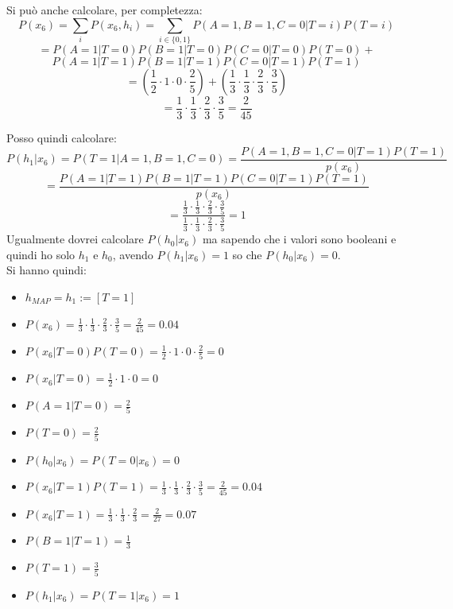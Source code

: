 \documentclass[a4paper,12pt, oneside]{book}
\begin{document}
\begin{esercizio}
  Si può anche calcolare, per completezza:
  \[P(x_6)=\sum_iP(x_6,h_i)=\sum_{i\in\{0,1\}}P(A=1,B=1,C=0|T=i)P(T=i)\]
  \[= P(A=1|T=0)P(B=1|T=0)P(C=0|T=0)P(T=0)+\]
  \[P(A=1|T=1)P(B=1|T=1)P(C=0|T=1)P(T=1)\]
  \[=( \frac{1}{2}\cdot 1\cdot  0\cdot\frac{2}{5})+(\frac{1}{3}\cdot
    \frac{1}{3}\cdot \frac{2}{3}\cdot\frac{3}{5})\]
  \[=\frac{1}{3}\cdot \frac{1}{3}\cdot
    \frac{2}{3}\cdot\frac{3}{5}=\frac{2}{45}\]

  Posso quindi calcolare:
  \[P(h_1|x_6)=P(T=1|A=1,B=1,C=0)=\frac{P(A=1,B=1,C=0|T=1)P(T=1)}{p(x_6)}\]
  \[=\frac{P(A=1|T=1)P(B=1|T=1)P(C=0|T=1)P(T=1)}{p(x_6)}\]
  \[=\frac{\frac{1}{3}\cdot \frac{1}{3}\cdot
      \frac{2}{3}\cdot\frac{3}{5}}
    {\frac{1}{3}\cdot \frac{1}{3}\cdot
      \frac{2}{3}\cdot\frac{3}{5}}=1\]
  Ugualmente dovrei calcolare $P(h_0|x_6)$ ma sapendo che i valori sono booleani
  e quindi ho solo $h_1$ e $h_0$, avendo $P(h_1|x_6)=1$ so che
  $P(h_0|x_6)=0$. \\
  Si hanno quindi:
  \begin{itemize}
    \item $h_{MAP}=h_1:=[T=1]$
    \item $P(x_6)=\frac{1}{3}\cdot \frac{1}{3}\cdot
    \frac{2}{3}\cdot\frac{3}{5}=\frac{2}{45}=0.04$
    \item $P(x_6|T=0)P(T=0)= \frac{1}{2}\cdot 1\cdot  0\cdot\frac{2}{5}=0$
    \item $P(x_6|T=0)= \frac{1}{2}\cdot 1\cdot  0=0$
    \item $P(A=1|T=0)=\frac{2}{5}$
    \item $P(T=0)=\frac{2}{5}$
    \item $P(h_0|x_6)=P(T=0|x_6)=0$
    \item $P(x_6|T=1)P(T=1)=\frac{1}{3}\cdot \frac{1}{3}\cdot
    \frac{2}{3}\cdot\frac{3}{5}=\frac{2}{45}=0.04$
    \item $P(x_6|T=1)=\frac{1}{3}\cdot \frac{1}{3}\cdot
    \frac{2}{3}=\frac{2}{27}=0.07$
    \item $P(B=1|T=1)=\frac{1}{3}$
    \item $P(T=1)=\frac{3}{5}$
    \item $P(h_1|x_6)=P(T=1|x_6)=1$
  \end{itemize}
\end{esercizio}
\end{document}
